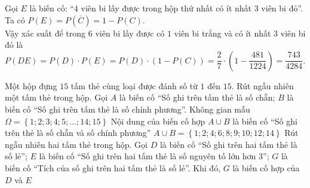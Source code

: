 \begin{ex}
{\begin{itemchoice}
			Gọi $E$ là biến cố: “$4$ viên bi lấy được trong hộp thứ nhất có ít nhất $3$ viên bi đỏ”. \\
			Ta có $P\left( E \right)=P\left( \overline{C} \right)=1-P\left( C \right)$. \\
			Vậy xác suất để trong $6$ viên bi lấy được có $1$ viên bi trắng và có ít nhất $3$ viên bi đỏ là $P\left( DE \right)=P\left( D \right)\cdot P\left( E \right)=P\left( D \right)\cdot \left( 1-P\left( C \right) \right)=\dfrac{2}{7}\cdot \left( 1-\dfrac{481}{1224} \right)=\dfrac{743}{4284}$.
		\end{itemchoice}
	}
\end{ex}

\begin{ex}%
	Một hộp đựng $15$ tấm thẻ cùng loại được đánh số từ $1$ đến $15$. Rút ngẫu nhiên một tấm thẻ trong hộp. Gọi $A$ là biến cố “Số ghi trên tấm thẻ là số chẵn; $B$ là biến cố “Số ghi trên tấm thẻ là số chính phương”.
	\choiceTF
	{\True Không gian mẫu $\Omega =\left\{ 1;2;3;4;5;...; 14;15 \right\}$}
	{Nội dung của biến cố hợp $A\cup B$ là biến cố “Số ghi trên thẻ là số chẵn và số chính phương”}
	{\True $A\cup B=\left\{ 1;2;4;6;8;9;10;12;14 \right\}$}
	{\True Rút ngẫu nhiên hai tấm thẻ trong hộp. Gọi $D$ là biến cố “Số ghi trên hai tấm thẻ là số lẻ”; $E$ là biến cố “Số ghi trên hai tấm thẻ là số nguyên tố lớn hơn $3$”; $G$ là biến cố “Tích của số ghi trên hai tấm thẻ là số lẻ”. Khi đó, $G$ là biến cố hợp của $D$ và $E$} 
\end{ex}

